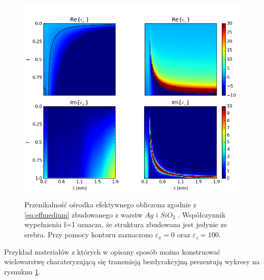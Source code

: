 \begin{figure}[tbh]
	\includegraphics[width=\textwidth]{images/multilayer/agsio2-effective.png}
	\caption{Przenikalność ośrodka efektywnego obliczona zgodnie z \ref{eq:effmedium}  zbudowanego z warstw $Ag$ \cite{PhysRevB.6.4370} i $SiO_2$ \cite{MALITSON:65}. Współczynnik wypełnienia f=1 oznacza, że struktura zbudowana jest jedynie ze srebra. Przy pomocy konturu zaznaczono $\varepsilon_x=0$ oraz $\varepsilon_z=100$.}
	\label{fig:multiex}
\end{figure}

Przykład materiałów z których w opisany sposób można konstruować wielowarstwę charateryzującą się transmisją bezdyrakcyjną prezentują wykresy na rysnuknu \ref{fig:multiex}. 





